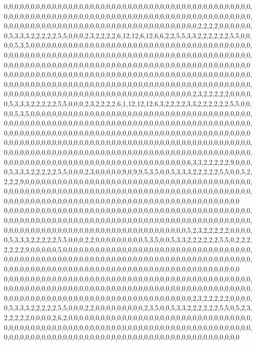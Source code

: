 0,0,0,0,0,0,0,0,0,0,0,0,0,0,0,0,0,0,0,0,0,0,0,0,0,0,0,0,0,0,0,0,0,0,0,0,0,0,0,0,0,0,0,0,0,0,0,0,0,0,0,0,0,0,0,0,0,0,0,0,0,0,0,0,0,0,0,0,0,0,0,0,0,0,0,0,0,0,0,0,0,0,0,0,0,0,0,0,0,0,0,0,0,0,0,0,0,0,0,0,0,0,0,0,0,0,0,0,0,0,0,0,0,0,0,0,0,0,0,0,0,0,0,0,0,0,0,0,2,2,2,2,0,0,0,0,0,0,0,5,3,3,3,2,2,2,2,2,5,5,0,0,0,2,3,2,2,2,2,6,12,12,6,12,6,6,2,2,5,5,3,3,2,2,2,2,2,2,5,5,0,0,0,0,5,3,5,0,0,0,0,0,0,0,0,0,0,0,0,0,0,0,0,0,0,0,0,0,0,0,0,0,0,0,0,0,0,0,0,0,0,0,0,0,0,0,0,0,0,0,0,0,0,0,0,0,0,0,0,0,0,0,0,0,0,0,0,0,0,0,0,0,0,0,0,0,0,0,0,0,0,0,0,0,0,0,0,0,0,0,0,0,0,0,0,0,0,0,0,0,0,0,0,0,0,0,0,0,0,0,0,0,0,0,0,0,0,0,0,0,0,0,0,0,0,0,0,0,0,0,0,0,0,0,0,0,0,0,0,0
0,0,0,0,0,0,0,0,0,0,0,0,0,0,0,0,0,0,0,0,0,0,0,0,0,0,0,0,0,0,0,0,0,0,0,0,0,0,0,0,0,0,0,0,0,0,0,0,0,0,0,0,0,0,0,0,0,0,0,0,0,0,0,0,0,0,0,0,0,0,0,0,0,0,0,0,0,0,0,0,0,0,0,0,0,0,0,0,0,0,0,0,0,0,0,0,0,0,0,0,0,0,0,0,0,0,0,0,0,0,0,0,0,0,0,0,0,0,0,0,0,0,0,0,0,0,0,2,3,2,2,2,2,2,0,0,0,0,0,5,3,3,3,2,2,2,2,2,5,5,0,0,0,2,3,2,2,2,2,6,1,12,12,12,6,3,2,2,2,2,3,3,2,2,2,2,2,2,5,5,0,0,0,0,5,3,5,0,0,0,0,0,0,0,0,0,0,0,0,0,0,0,0,0,0,0,0,0,0,0,0,0,0,0,0,0,0,0,0,0,0,0,0,0,0,0,0,0,0,0,0,0,0,0,0,0,0,0,0,0,0,0,0,0,0,0,0,0,0,0,0,0,0,0,0,0,0,0,0,0,0,0,0,0,0,0,0,0,0,0,0,0,0,0,0,0,0,0,0,0,0,0,0,0,0,0,0,0,0,0,0,0,0,0,0,0,0,0,0,0,0,0,0,0,0,0,0,0,0,0,0,0,0,0,0,0,0,0,0,0
0,0,0,0,0,0,0,0,0,0,0,0,0,0,0,0,0,0,0,0,0,0,0,0,0,0,0,0,0,0,0,0,0,0,0,0,0,0,0,0,0,0,0,0,0,0,0,0,0,0,0,0,0,0,0,0,0,0,0,0,0,0,0,0,0,0,0,0,0,0,0,0,0,0,0,0,0,0,0,0,0,0,0,0,0,0,0,0,0,0,0,0,0,0,0,0,0,0,0,0,0,0,0,0,0,0,0,0,0,0,0,0,0,0,0,0,0,0,0,0,0,0,0,0,0,0,6,3,3,2,2,2,2,2,9,0,0,0,0,5,3,3,3,2,2,2,2,2,5,5,0,0,0,2,3,0,0,0,0,0,9,0,9,9,5,3,5,0,0,5,3,3,3,2,2,2,2,2,5,5,0,0,5,2,2,2,2,9,0,0,0,0,0,0,0,0,0,0,0,0,0,0,0,0,0,0,0,0,0,0,0,0,0,0,0,0,0,0,0,0,0,0,0,0,0,0,0,0,0,0,0,0,0,0,0,0,0,0,0,0,0,0,0,0,0,0,0,0,0,0,0,0,0,0,0,0,0,0,0,0,0,0,0,0,0,0,0,0,0,0,0,0,0,0,0,0,0,0,0,0,0,0,0,0,0,0,0,0,0,0,0,0,0,0,0,0,0,0,0,0,0,0,0,0,0,0,0,0,0,0,0,0,0,0,0,0,0,0,0,0
0,0,0,0,0,0,0,0,0,0,0,0,0,0,0,0,0,0,0,0,0,0,0,0,0,0,0,0,0,0,0,0,0,0,0,0,0,0,0,0,0,0,0,0,0,0,0,0,0,0,0,0,0,0,0,0,0,0,0,0,0,0,0,0,0,0,0,0,0,0,0,0,0,0,0,0,0,0,0,0,0,0,0,0,0,0,0,0,0,0,0,0,0,0,0,0,0,0,0,0,0,0,0,0,0,0,0,0,0,0,0,0,0,0,0,0,0,0,0,0,0,0,0,0,0,0,5,2,3,2,2,2,2,2,0,0,0,0,0,5,3,3,3,2,2,2,2,2,5,5,0,0,0,2,2,0,0,0,0,0,0,0,0,0,5,3,5,0,0,5,3,3,2,2,2,2,2,2,5,5,0,2,2,2,2,2,2,2,9,0,0,0,0,0,5,0,0,0,0,0,0,0,0,0,0,0,0,0,0,0,0,0,0,0,0,0,0,0,0,0,0,0,0,0,0,0,0,0,0,0,0,0,0,0,0,0,0,0,0,0,0,0,0,0,0,0,0,0,0,0,0,0,0,0,0,0,0,0,0,0,0,0,0,0,0,0,0,0,0,0,0,0,0,0,0,0,0,0,0,0,0,0,0,0,0,0,0,0,0,0,0,0,0,0,0,0,0,0,0,0,0,0,0,0,0,0,0,0,0,0,0,0,0,0,0,0,0,0,0,0
0,0,0,0,0,0,0,0,0,0,0,0,0,0,0,0,0,0,0,0,0,0,0,0,0,0,0,0,0,0,0,0,0,0,0,0,0,0,0,0,0,0,0,0,0,0,0,0,0,0,0,0,0,0,0,0,0,0,0,0,0,0,0,0,0,0,0,0,0,0,0,0,0,0,0,0,0,0,0,0,0,0,0,0,0,0,0,0,0,0,0,0,0,0,0,0,0,0,0,0,0,0,0,0,0,0,0,0,0,0,0,0,0,0,0,0,0,0,0,0,0,0,0,0,0,0,0,2,3,2,2,2,2,2,0,0,0,0,0,5,3,3,3,2,2,2,2,2,5,5,0,0,0,2,2,0,0,0,0,0,0,0,0,0,2,3,5,0,0,5,3,3,2,2,2,2,2,2,5,5,0,5,2,3,2,2,2,2,2,0,0,0,0,2,6,2,0,0,0,0,0,0,0,0,0,0,0,0,0,0,0,0,0,0,0,0,0,0,0,0,0,0,0,0,0,0,0,0,0,0,0,0,0,0,0,0,0,0,0,0,0,0,0,0,0,0,0,0,0,0,0,0,0,0,0,0,0,0,0,0,0,0,0,0,0,0,0,0,0,0,0,0,0,0,0,0,0,0,0,0,0,0,0,0,0,0,0,0,0,0,0,0,0,0,0,0,0,0,0,0,0,0,0,0,0,0,0,0,0,0,0,0,0,0,0,0,0,0,0,0
